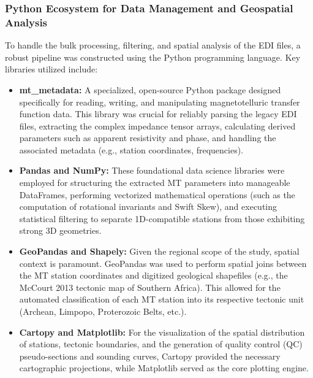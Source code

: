 \subsubsection{Python Ecosystem for Data Management and Geospatial Analysis}
To handle the bulk processing, filtering, and spatial analysis of the EDI files, a robust pipeline was constructed using the Python programming language. Key libraries utilized include:
\begin{itemize}
    \item \textbf{mt\_metadata:} A specialized, open-source Python package designed specifically for reading, writing, and manipulating magnetotelluric transfer function data. This library was crucial for reliably parsing the legacy EDI files, extracting the complex impedance tensor arrays, calculating derived parameters such as apparent resistivity and phase, and handling the associated metadata (e.g., station coordinates, frequencies).
    \item \textbf{Pandas and NumPy:} These foundational data science libraries were employed for structuring the extracted MT parameters into manageable DataFrames, performing vectorized mathematical operations (such as the computation of rotational invariants and Swift Skew), and executing statistical filtering to separate 1D-compatible stations from those exhibiting strong 3D geometries.
    \item \textbf{GeoPandas and Shapely:} Given the regional scope of the study, spatial context is paramount. GeoPandas was used to perform spatial joins between the MT station coordinates and digitized geological shapefiles (e.g., the McCourt 2013 tectonic map of Southern Africa). This allowed for the automated classification of each MT station into its respective tectonic unit (Archean, Limpopo, Proterozoic Belts, etc.).
    \item \textbf{Cartopy and Matplotlib:} For the visualization of the spatial distribution of stations, tectonic boundaries, and the generation of quality control (QC) pseudo-sections and sounding curves, Cartopy provided the necessary cartographic projections, while Matplotlib served as the core plotting engine.
\end{itemize}

